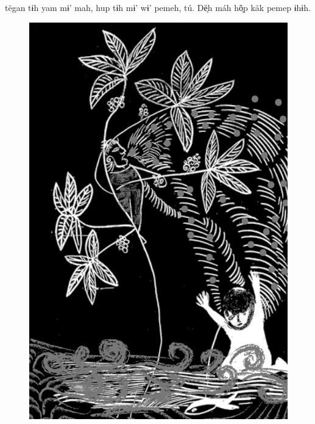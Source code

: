 \vspace{2em}

 tëgan tɨh yam mɨ’ mah,
hup tɨh mɨ’ wɨ’ pemeh, tú.
Dë̖h máh hõ̖p käk pemep ɨhɨh.

\vspace*{\fill}

\begin{figure}
\vspace*{-2cm}
\hspace*{-2.4cm}\includegraphics[width=142mm]{./imgs/img2.jpg}
\end{figure}

\chapter*{}

